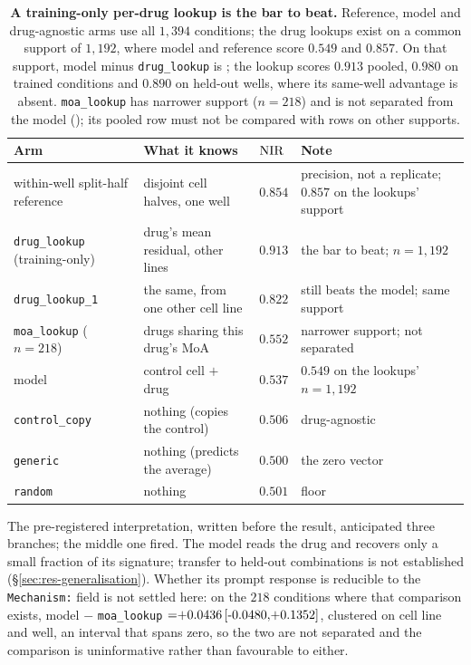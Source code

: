 \begin{table}[htbp]
\centering
\footnotesize
\setlength{\tabcolsep}{3pt}
\begin{tabularx}{\textwidth}{@{}>{\raggedright\arraybackslash}p{}
  >{\raggedright\arraybackslash}p{}
  >{\centering\arraybackslash}p{}X@{}}
\toprule
Arm & What it knows & $\textrm{NIR}$ & Note \\
\midrule
within-well split-half reference & disjoint cell halves, one well & $0.854$ & precision, not a replicate; $0.857$ on the lookups' support \\
\texttt{drug\_lookup} (training-only) & drug's mean residual, other lines & $0.913$ & the bar to beat; $n = 1{,}192$ \\
\texttt{drug\_lookup\_1} & the same, from one other cell line & $0.822$ & still beats the model; same support \\
\texttt{moa\_lookup} ($n = 218$) & drugs sharing this drug's MoA & $0.552$ & narrower support; not separated \\
model & control cell $+$ drug & $0.537$ & $0.549$ on the lookups' $n = 1{,}192$ \\
\texttt{control\_copy} & nothing (copies the control) & $0.506$ & drug-agnostic \\
\texttt{generic} & nothing (predicts the average) & $0.500$ & the zero vector \\
\texttt{random} & nothing & $0.501$ & floor \\

\bottomrule
\end{tabularx}
\caption{\textbf{A training-only per-drug lookup is the bar to beat.} Reference, model and
drug-agnostic arms use all $1{,}394$ conditions; the drug lookups exist on a common support of
$1{,}192$, where model and reference score $0.549$ and $0.857$. On that support, model minus
\texttt{drug\_lookup} is ; the lookup scores $0.913$ pooled, $0.980$
on trained conditions and $0.890$ on held-out wells, where its same-well advantage is absent.
\texttt{moa\_lookup} has narrower support ($n=218$) and is not separated from the model
(); its pooled row must not be compared with rows on other supports.}
\label{tab:baselines}
\label{tab:lookup}
\end{table}

The pre-registered interpretation, written before the result, anticipated three branches; the middle
one fired. The model reads the drug and recovers only a small fraction of its signature; transfer to
held-out combinations is not established (\S\ref{sec:res-generalisation}). Whether its prompt
response is reducible to the \texttt{Mechanism:} field is not settled
here: on the $218$ conditions where that comparison exists,
model $-$ \texttt{moa\_lookup} $= \ci{+0.0436}{-0.0480}{+0.1352}$, clustered on cell line and well,
an interval that spans zero, so the two are not separated and the comparison is uninformative
rather than favourable to either.

